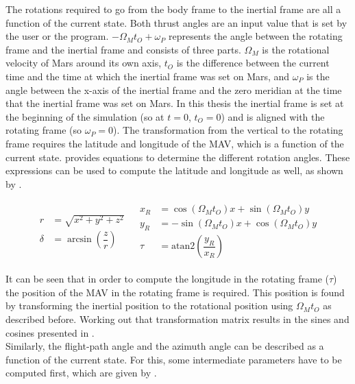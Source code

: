 \noindent
The rotations required to go from the body frame to the inertial frame are all a function of the current state. Both thrust angles are an input value that is set by the user or the program. $-\Omega_{M}t_{O}+\omega_{P}$ represents the angle between the rotating frame and the inertial frame and consists of three parts. $\Omega_{M}$ is the rotational velocity of Mars around its own axis, $t_{O}$ is the difference between the current time and the time at which the inertial frame was set on Mars, and $\omega_{P}$ is the angle between the x-axis of the inertial frame and the zero meridian at the time that the inertial frame was set on Mars. In this thesis the inertial frame is set at the beginning of the simulation (so at $t=0$, $t_{O}=0$) and is aligned with the rotating frame (so $\omega_{P}=0$). The transformation from the vertical to the rotating frame requires the latitude and longitude of the \ac{MAV}, which is a function of the current state. \cite{mooij1994motion} provides equations to determine the different rotation angles. These expressions can be used to compute the latitude and longitude as well, as shown by .

\begin{align} \label{eq:latAndLong}
\begin{split} 
r&=\sqrt{x^{2}+y^{2}+z^{2}}\\
\delta&=\arcsin\left(\dfrac{z}{r}\right)
\end{split} 
&
\begin{split}
x_{R}&=\cos\left(\Omega_{M}t_{O}\right)x+\sin\left(\Omega_{M}t_{O}\right)y\\
y_{R}&=-\sin\left(\Omega_{M}t_{O}\right)x+\cos\left(\Omega_{M}t_{O}\right)y\\
\tau&=\text{atan2}\left(\dfrac{y_{R}}{x_{R}}\right)
\end{split}
\end{align}

\noindent 
It can be seen that in order to compute the longitude in the rotating frame ($\tau$) the position of the \ac{MAV} in the rotating frame is required. This position is found by transforming the inertial position to the rotational position using $\Omega_{M}t_{O}$ as described before. Working out that transformation matrix results in the sines and cosines presented in .\\

\noindent
Similarly, the flight-path angle and the azimuth angle can be described as a function of the current state. For this, some intermediate parameters have to be computed first, which are given by .

